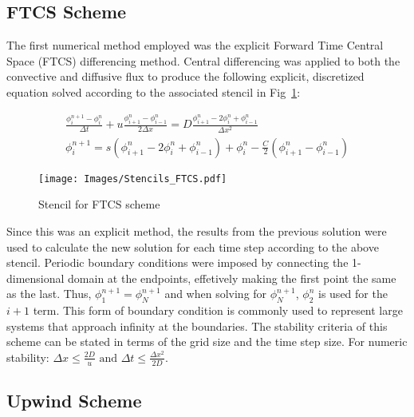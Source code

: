 \documentclass[twocolumn,10pt]{asme2ej}
\begin{document}
\subsection{FTCS Scheme}

The first numerical method employed was the explicit Forward Time Central Space (FTCS) differencing method.  Central differencing was applied to both the convective and diffusive flux to produce the following explicit, discretized equation solved according to the associated stencil in Fig~\ref{FTCS}:

\begin{equation}
\begin{split}
\frac{\phi^{n+1}_{i} - \phi^{n}_{i}}{\Delta t} + u\frac{\phi^{n}_{i+1} - \phi^{n}_{i-1}}{2\Delta x} = D\frac{\phi^{n}_{i+1} -   2\phi^{n}_{i} + \phi^{n}_{i-1}}{\Delta x^2}\\
\phi^{n+1}_{i} = s(\phi^{n}_{i+1} - 2\phi^{n}_{i} + \phi^{n}_{i-1})+ \phi^{n}_{i} - \frac{C}{2}(\phi^{n}_{i+1} - \phi^{n}_{i-1})
\end{split}
\end{equation}

\vspace{-4em}
\begin{figure}[thb]
\begin{center}
\texttt{[image: Images/Stencils\_FTCS.pdf]}
\caption{Stencil for FTCS scheme}
\label{FTCS}
\end{center}
\end{figure}

Since this was an explicit method, the results from the previous solution were used to calculate the new solution for each time step according to the above stencil.  Periodic boundary conditions were imposed by connecting the 1-dimensional domain at the endpoints, effetively making the first point the same as the last.  Thus, $\phi^{n+1}_{1}=\phi^{n+1}_{N}$ and when solving for $\phi^{n+1}_{N}$, $\phi^{n}_{2}$ is used for the $i+1$ term.  This form of boundary condition is commonly used to represent large systems that approach infinity at the boundaries.  The stability criteria of this scheme can be stated in terms of the grid size and the time step size.  For numeric stability:   $\Delta x \leq \frac{2D}{u} \mbox{ and } \Delta t \leq \frac{\Delta x^2}{2D}$.

\subsection{Upwind Scheme}
\end{document}
